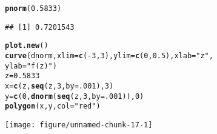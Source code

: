 \documentclass{article}\usepackage[]{graphicx}\usepackage[]{xcolor}
\makeatletter
\def\maxwidth{ %
  \ifdim\Gin@nat@width>\linewidth
    \linewidth
  \else
    \Gin@nat@width
  \fi
}
\newcommand{\hlnum}[1]{\textcolor[rgb]{0.686,0.059,0.569}{#1}}%
\newcommand{\hlsng}[1]{\textcolor[rgb]{0.192,0.494,0.8}{#1}}%
\newcommand{\hlopt}[1]{\textcolor[rgb]{0,0,0}{#1}}%
\newcommand{\hldef}[1]{\textcolor[rgb]{0.345,0.345,0.345}{#1}}%
\newcommand{\hlkwb}[1]{\textcolor[rgb]{0.69,0.353,0.396}{#1}}%
\newcommand{\hlkwc}[1]{\textcolor[rgb]{0.333,0.667,0.333}{#1}}%
\newcommand{\hlkwd}[1]{\textcolor[rgb]{0.737,0.353,0.396}{\textbf{#1}}}%
\newenvironment{kframe}{%
 \def\at@end@of@kframe{}%
 \ifinner\ifhmode%
  \def\at@end@of@kframe{\end{minipage}}%
  \begin{minipage}{\columnwidth}%
 \fi\fi%
 \def\FrameCommand##1{\hskip\@totalleftmargin \hskip-\fboxsep
 \colorbox{shadecolor}{##1}\hskip-\fboxsep
     \hskip-\linewidth \hskip-\@totalleftmargin \hskip\columnwidth}%
 \MakeFramed {\advance\hsize-\width
   \@totalleftmargin\z@ \linewidth\hsize
   \@setminipage}}%
 {\par\unskip\endMakeFramed%
 \at@end@of@kframe}
\newenvironment{knitrout}{}{} %
\makeatother
\begin{document}
\begin{knitrout}
\color{fgcolor}\begin{kframe}
\begin{alltt}
\hlkwd{pnorm}\hldef{(}\hlnum{0.5833}\hldef{)}
\end{alltt}
\begin{verbatim}
## [1] 0.7201543
\end{verbatim}
\begin{alltt}
\hlkwd{plot.new}\hldef{()}
\hlkwd{curve} \hldef{(dnorm,} \hlkwc{xlim} \hldef{=} \hlkwd{c}\hldef{(}\hlopt{-}\hlnum{3}\hldef{,} \hlnum{3}\hldef{),} \hlkwc{ylim} \hldef{=} \hlkwd{c}\hldef{(}\hlnum{0}\hldef{,} \hlnum{0.5}\hldef{),} \hlkwc{xlab} \hldef{=} \hlsng{"z"}\hldef{,}
       \hlkwc{ylab}\hldef{=}\hlsng{"f(z)"}\hldef{)}
\hldef{z} \hlkwb{=} \hlnum{0.5833}
\hldef{x} \hlkwb{=} \hlkwd{c}\hldef{(z,} \hlkwd{seq}\hldef{(z,} \hlnum{3}\hldef{,} \hlkwc{by}\hldef{=}\hlnum{.001}\hldef{),} \hlnum{3}\hldef{)}
\hldef{y} \hlkwb{=} \hlkwd{c}\hldef{(}\hlnum{0}\hldef{,} \hlkwd{dnorm}\hldef{(}\hlkwd{seq}\hldef{(z,} \hlnum{3}\hldef{,} \hlkwc{by}\hldef{=}\hlnum{.001}\hldef{)),} \hlnum{0}\hldef{)}
\hlkwd{polygon}\hldef{(x, y,} \hlkwc{col}\hldef{=}\hlsng{"red"}\hldef{)}
\end{alltt}
\end{kframe}
\texttt{[image: figure/unnamed-chunk-17-1]} 
\end{knitrout}
\end{document}
